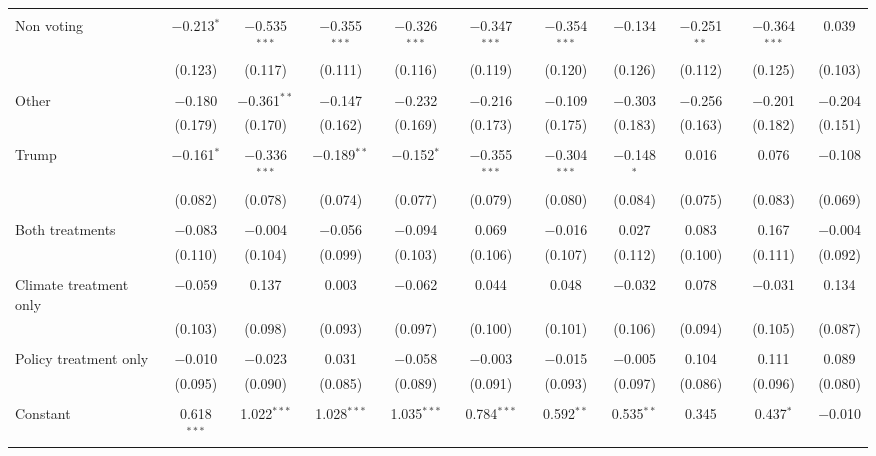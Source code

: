 \begin{tabular}{@{\extracolsep{5pt}}lcccccccccc}
  & & & & & & & & & & \\ 
 Non voting & $-$0.213$^{*}$ & $-$0.535$^{***}$ & $-$0.355$^{***}$ & $-$0.326$^{***}$ & $-$0.347$^{***}$ & $-$0.354$^{***}$ & $-$0.134 & $-$0.251$^{**}$ & $-$0.364$^{***}$ & 0.039 \\ 
  & (0.123) & (0.117) & (0.111) & (0.116) & (0.119) & (0.120) & (0.126) & (0.112) & (0.125) & (0.103) \\ 
  & & & & & & & & & & \\ 
 Other & $-$0.180 & $-$0.361$^{**}$ & $-$0.147 & $-$0.232 & $-$0.216 & $-$0.109 & $-$0.303 & $-$0.256 & $-$0.201 & $-$0.204 \\ 
  & (0.179) & (0.170) & (0.162) & (0.169) & (0.173) & (0.175) & (0.183) & (0.163) & (0.182) & (0.151) \\ 
  & & & & & & & & & & \\ 
 Trump & $-$0.161$^{*}$ & $-$0.336$^{***}$ & $-$0.189$^{**}$ & $-$0.152$^{*}$ & $-$0.355$^{***}$ & $-$0.304$^{***}$ & $-$0.148$^{*}$ & 0.016 & 0.076 & $-$0.108 \\ 
  & (0.082) & (0.078) & (0.074) & (0.077) & (0.079) & (0.080) & (0.084) & (0.075) & (0.083) & (0.069) \\ 
  & & & & & & & & & & \\ 
 Both treatments & $-$0.083 & $-$0.004 & $-$0.056 & $-$0.094 & 0.069 & $-$0.016 & 0.027 & 0.083 & 0.167 & $-$0.004 \\ 
  & (0.110) & (0.104) & (0.099) & (0.103) & (0.106) & (0.107) & (0.112) & (0.100) & (0.111) & (0.092) \\ 
  & & & & & & & & & & \\ 
 Climate treatment only & $-$0.059 & 0.137 & 0.003 & $-$0.062 & 0.044 & 0.048 & $-$0.032 & 0.078 & $-$0.031 & 0.134 \\ 
  & (0.103) & (0.098) & (0.093) & (0.097) & (0.100) & (0.101) & (0.106) & (0.094) & (0.105) & (0.087) \\ 
  & & & & & & & & & & \\ 
 Policy treatment only & $-$0.010 & $-$0.023 & 0.031 & $-$0.058 & $-$0.003 & $-$0.015 & $-$0.005 & 0.104 & 0.111 & 0.089 \\ 
  & (0.095) & (0.090) & (0.085) & (0.089) & (0.091) & (0.093) & (0.097) & (0.086) & (0.096) & (0.080) \\ 
  & & & & & & & & & & \\ 
 Constant & 0.618$^{***}$ & 1.022$^{***}$ & 1.028$^{***}$ & 1.035$^{***}$ & 0.784$^{***}$ & 0.592$^{**}$ & 0.535$^{**}$ & 0.345 & 0.437$^{*}$ & $-$0.010 \\ 

\end{tabular}
